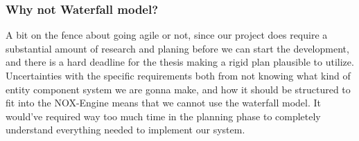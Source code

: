 \subsubsection{Why not Waterfall model?}
A bit on the fence about going agile or not, since our project does require a substantial amount of research and planing before we can start the development, 
and there is a hard deadline for the thesis making a rigid plan plausible to utilize. 
Uncertainties with the specific requirements both from not knowing what kind of entity component system we are gonna make, 
and how it should be structured to fit into the NOX-Engine means that we cannot use the waterfall model.
It would've required way too much time in the planning phase to completely understand everything needed to implement our system.